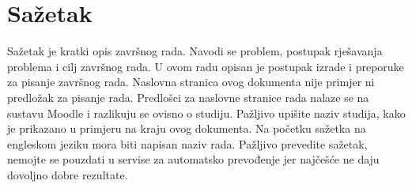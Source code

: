 \section*{Sažetak}
\label{sec:summary}
Sažetak je kratki opis završnog rada. Navodi se problem, postupak rješavanja problema i cilj završnog rada. U ovom radu opisan je postupak izrade i preporuke za pisanje završnog rada. Naslovna stranica ovog dokumenta nije primjer ni predložak za pisanje rada. Predlošci za naslovne stranice rada nalaze se na sustavu Moodle i razlikuju se ovisno o studiju. Pažljivo upišite naziv studija, kako je prikazano u primjeru na kraju ovog dokumenta. Na početku sažetka na engleskom jeziku mora biti napisan naziv rada. Pažljivo prevedite sažetak, nemojte se pouzdati u servise za automatsko prevođenje jer najčešće ne daju dovoljno dobre rezultate.
